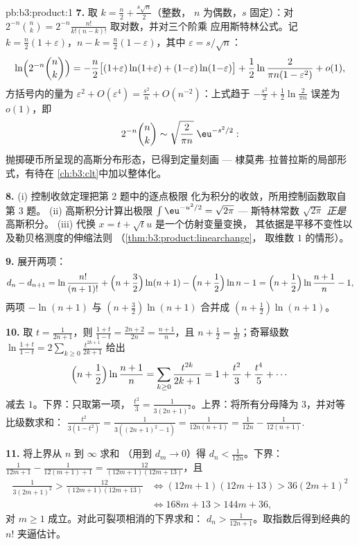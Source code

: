 \begin{solution}{pb:b3:product:1}
\textbf{7.} 取 $k = \frac n2 + \frac{s\sqrt n}2$（整数，
$n$ 为偶数，$s$ 固定）：对 $2^{-n}\binom nk =
2^{-n}\frac{n!}{k!(n-k)!}$ 取对数，并对三个阶乘
应用斯特林公式。记 $k = \frac n2(1 + \varepsilon)$，$n - k =
\frac n2(1 - \varepsilon)$，其中 $\varepsilon = s/\sqrt n$：
\[
\ln\Bigl(2^{-n}\binom nk\Bigr)
= -\frac n2\bigl[(1{+}\varepsilon)\ln(1{+}\varepsilon) +
(1{-}\varepsilon)\ln(1{-}\varepsilon)\bigr]
+ \frac12\ln\frac{2}{\pi n(1 - \varepsilon^2)} + o(1),
\]
方括号内的量为 $\varepsilon^2 + O(\varepsilon^4) =
\frac{s^2}n + O(n^{-2})$：上式趋于 $-\frac{s^2}2 +
\frac12\ln\frac2{\pi n}$ 误差为 $o(1)$，即
\[
2^{-n}\binom nk \sim \sqrt{\frac{2}{\pi
n}}\;\eu^{-s^2/2} :
\]
抛掷硬币所呈现的高斯分布形态，已得到定量刻画 ---
棣莫弗–拉普拉斯的局部形式，有待在
\cref{ch:b3:clt}中加以整体化。

\textbf{8.} (i) 控制收敛定理把第 2 题中的逐点极限
化为积分的收敛，所用控制函数取自第 3 题。
(ii) 高斯积分计算出极限
$\int\eu^{-u^2/2} = \sqrt{2\pi}$ --- 斯特林常数
$\sqrt{2\pi}$ \emph{正是}高斯积分。
(iii) 代换 $x = t + \sqrt tu$ 是一个仿射变量变换，
其依据是平移不变性以及勒贝格测度的伸缩法则
（\cref{thm:b3:product:linearchange}，
取维数 $1$ 的情形）。

\textbf{9.} 展开两项：
\[
d_n - d_{n+1} = \ln\frac{n!}{(n+1)!} + \Bigl(n +
\frac32\Bigr)\ln(n+1) - \Bigl(n + \frac12\Bigr)\ln n - 1
= \Bigl(n + \frac12\Bigr)\ln\frac{n+1}n - 1,
\]
两项 $-\ln(n+1)$ 与 $(n + \frac32)\ln(n+1)$ 合并成
$(n + \frac12)\ln(n+1)$。

\textbf{10.} 取 $t = \frac1{2n+1}$，则 $\frac{1+t}{1-t} =
\frac{2n+2}{2n} = \frac{n+1}n$，且 $n + \frac12 =
\frac1{2t}$；奇幂级数 $\ln\frac{1+t}{1-t} =
2\sum_{k\geq0}\frac{t^{2k+1}}{2k+1}$ 给出
\[
\Bigl(n + \frac12\Bigr)\ln\frac{n+1}n
= \sum_{k\geq0}\frac{t^{2k}}{2k+1}
= 1 + \frac{t^2}3 + \frac{t^4}5 + \cdots
\]
减去 $1$。下界：只取第一项，
$\frac{t^2}3 = \frac1{3(2n+1)^2}$。上界：将所有分母降为
$3$，并对等比级数求和：
$\frac{t^2}{3(1 - t^2)} = \frac1{3((2n+1)^2 - 1)} =
\frac1{12n(n+1)} = \frac1{12n} - \frac1{12(n+1)}$.

\textbf{11.} 将上界从 $n$ 到 $\infty$ 求和
（用到 $d_m \to 0$）得 $d_n < \frac1{12n}$。下界：
$\frac1{12m+1} - \frac1{12(m+1)+1} =
\frac{12}{(12m+1)(12m+13)}$，且
\begin{align*}
\frac1{3(2m+1)^2} > \frac{12}{(12m+1)(12m+13)}
&\iff (12m+1)(12m+13) > 36(2m+1)^2 \\
&\iff 168m + 13 > 144m + 36,
\end{align*}
对 $m \geq 1$ 成立。对此可裂项相消的下界求和：
$d_n > \frac1{12n+1}$。取指数后得到经典的
$n!$ 夹逼估计。


\end{solution}
